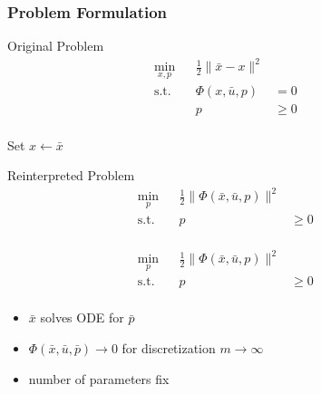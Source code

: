 \begin{frame}
    \frametitle{Problem Formulation}

    Original Problem
    \begin{align*}
        \min_{x,p} & & \frac{1}{2} \| \bar{x} - x \|^2 & & \\
        \operatorname{s.t.} & & \Phi(x,\bar{u},p) & = 0 & & \\
                            & & p & \geq 0 & & \\
    \end{align*}

    Set $x \leftarrow \bar{x}$

    Reinterpreted Problem
    \begin{align*}
        \min_{p}  & & \frac{1}{2} \| \Phi(\bar{x},\bar{u},p) \|^2 & & \\
        \operatorname{s.t.} & & p & \geq 0 & & \\
    \end{align*}
\end{frame}

\begin{frame}
    \begin{align*}
        \min_{p}  & & \frac{1}{2} \| \Phi(\bar{x},\bar{u},p) \|^2 & & \\
        \operatorname{s.t.} & & p & \geq 0 & & \\
    \end{align*}
    \begin{itemize}
        \item{$\bar{x}$ solves ODE for $\bar{p}$}
        \item{$\Phi(\bar{x},\bar{u},\bar{p}) \rightarrow 0$ for discretization $m \rightarrow \infty$}
        \item{number of parameters fix}
    \end{itemize}
\end{frame}

